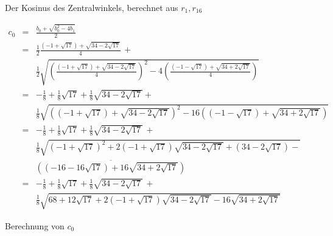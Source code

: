 \begin{figure}[b]
\begin{center}
\end{center}
\caption{Der Kosinus des Zentralwinkels, berechnet aus $r_1,r_{16}$}\label{f.hept-cosine}
\end{figure}

\begin{figure}[tb]
\begin{eqnarray*}
c_0&=&\frac{b_0+\sqrt{b_0^2-4b_1}}{2}\\
&=&\frac{1}{2}
     \frac{
     (-1+\sqrt{17}) + 
     \sqrt{34-2\sqrt{17}}
   }{4}\,+ \\
&& 
    \frac{1}{2}
       \sqrt{\left(\frac{
     (-1+\sqrt{17}) + 
     \sqrt{34-2\sqrt{17}}
   }{4}\right)^2-4\left(\frac{
     (-1-\sqrt{17}) + 
     \sqrt{34+2\sqrt{17}}
   }{4}\right)}
   \\
&=&-\frac{1}{8}+\frac{1}{8}\sqrt{17} + 
     \frac{1}{8}\sqrt{34-2\sqrt{17}}
    + \\
   &&
     \frac{1}{8}\sqrt{
     \left(
     (-1+\sqrt{17}) + 
     \sqrt{34-2\sqrt{17}}
   \right)^2-16\left(
     (-1-\sqrt{17}) + 
     \sqrt{34+2\sqrt{17}}
   \right)}
\\
&=&-\frac{1}{8}+\frac{1}{8}\sqrt{17} + 
     \frac{1}{8}\sqrt{34-2\sqrt{17}}
   \, + \\
   &&
     \frac{1}{8}\sqrt{
     (-1+\sqrt{17})^2 + 
     2(-1+\sqrt{17})\sqrt{34-2\sqrt{17}}+
     (34-2\sqrt{17})
   -}\\
   &&\overline{
     \left((-16-16\sqrt{17}) + 
     16\sqrt{34+2\sqrt{17}}\right)
   }
\\
&=&-\frac{1}{8}+\frac{1}{8}\sqrt{17} + 
     \frac{1}{8}\sqrt{34-2\sqrt{17}}
    \,+ \\
   &&
     \frac{1}{8}\sqrt{
     68+12\sqrt{17} + 
     2(-1+\sqrt{17})\sqrt{34-2\sqrt{17}}
   -16
     \sqrt{34+2\sqrt{17}}
   }
\end{eqnarray*}
\caption{Berechnung von $c_0$}\label{fig.c0}
\end{figure}

